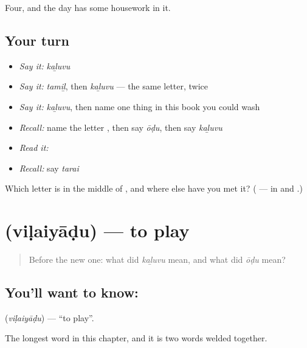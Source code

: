 \begin{grammarlens}[title={What you've built}]
Four, and the day has some housework in it.
\end{grammarlens}

\subsection*{Your turn}
\begin{itemize}
\raggedright
  \item \emph{Say it:} \emph{kaḻuvu}
  \item \emph{Say it:} \emph{tamiḻ}, then \emph{kaḻuvu} — the same letter, twice
  \item \emph{Say it:} \emph{kaḻuvu}, then name one thing in this book you could wash
  \item \emph{Recall:} name the letter \textbf{}, then say \emph{ōḍu}, then say \emph{kaḻuvu}
  \item \emph{Read it:} \textbf{}
  \item \emph{Recall:} say \emph{tarai}
\end{itemize}

\begin{tcolorbox}[breakable,colback=teal!4,colframe=teal!35!black,title={Before you move on}]
Which letter is in the middle of , and where else have you met it? (\textbf{} — in \textbf{} and \textbf{}.)
\end{tcolorbox}
\section[\texorpdfstring{\ta{விளையாடு} (viḷaiyāḍu)}{விளையாடு (viḷaiyāḍu)}]{ (viḷaiyāḍu) — to play}

\label{lesson:TA-C71-play}



\begin{quote}
Before the new one: what did \emph{kaḻuvu} mean, and what did \emph{ōḍu} mean?
\end{quote}

\subsection*{You'll want to know: }
\textbf{} (\emph{viḷaiyāḍu}) — \textquotedblleft{}to play\textquotedblright{}.

The longest word in this chapter, and it is two words welded together.

